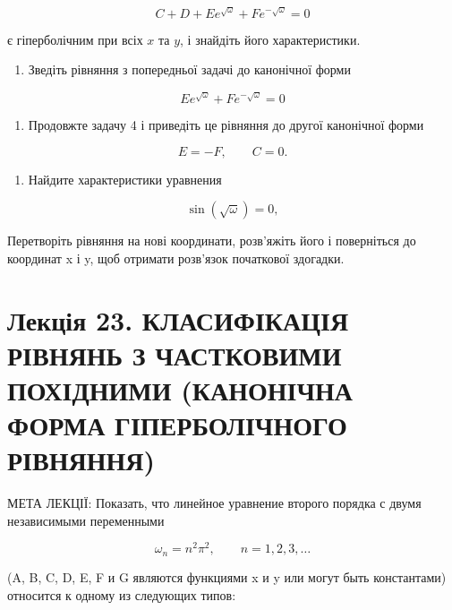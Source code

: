 \documentclass[
  ukrainian,
]{article}
\providecommand{\tightlist}{%
  \setlength{\itemsep}{0pt}\setlength{\parskip}{0pt}}
\begin{document}
\[
C + D + E e^{\sqrt{\omega}} + F e^{-\sqrt{\omega}} = 0
\]

є гіперболічним при всіх \(x\) та \(y\), і знайдіть його характеристики.

\begin{enumerate}
\def\labelenumi{\arabic{enumi}.}
\setcounter{enumi}{3}
\tightlist
\item
  Зведіть рівняння з попередньої задачі до канонічної форми
\end{enumerate}

\[
E e^{\sqrt{\omega}} + F e^{-\sqrt{\omega}} = 0
\]

\begin{enumerate}
\def\labelenumi{\arabic{enumi}.}
\setcounter{enumi}{4}
\tightlist
\item
  Продовжте задачу 4 і приведіть це рівняння до другої канонічної форми
\end{enumerate}

\[
E = -F, \qquad C = 0.
\]

\begin{enumerate}
\def\labelenumi{\arabic{enumi}.}
\setcounter{enumi}{5}
\tightlist
\item
  Найдите характеристики уравнения
\end{enumerate}

\[
\sin(\sqrt{\omega}) = 0,
\]

Перетворіть рівняння на нові координати, розв'яжіть його і поверніться
до координат x і y, щоб отримати розв'язок початкової здогадки.

\section{Лекція 23. КЛАСИФІКАЦІЯ РІВНЯНЬ З ЧАСТКОВИМИ ПОХІДНИМИ
(КАНОНІЧНА ФОРМА ГІПЕРБОЛІЧНОГО
РІВНЯННЯ)}\label{ux43bux435ux43aux446ux456ux44f-23.-ux43aux43bux430ux441ux438ux444ux456ux43aux430ux446ux456ux44f-ux440ux456ux432ux43dux44fux43dux44c-ux437-ux447ux430ux441ux442ux43aux43eux432ux438ux43cux438-ux43fux43eux445ux456ux434ux43dux438ux43cux438-ux43aux430ux43dux43eux43dux456ux447ux43dux430-ux444ux43eux440ux43cux430-ux433ux456ux43fux435ux440ux431ux43eux43bux456ux447ux43dux43eux433ux43e-ux440ux456ux432ux43dux44fux43dux43dux44f}

МЕТА ЛЕКЦІЇ: Показать, что линейное уравнение второго порядка с двумя
независимыми переменными

\[
\omega_n = n^2 \pi^2, \qquad n = 1,2,3,\dots
\]

(A, B, C, D, E, F и G являются функциями x и y или могут быть
константами) относится к одному из следующих типов:
\end{document}
